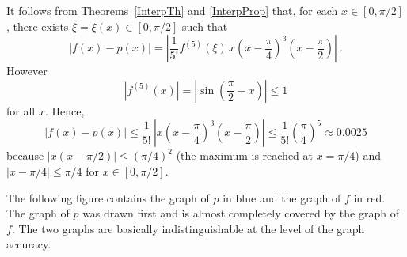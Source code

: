 {
It follows from Theorems~\ref{InterpTh} and \ref{InterpProp}
that, for each $x \in [0,\pi/2]$, there exists $\xi = \xi(x) \in [0,\pi/2]$
such that
\[
| f(x) - p(x) | = \left| \frac{1}{5!} f^{(5)}(\xi)
\, x \left(x-\frac{\pi}{4}\right)^3\left(x-\frac{\pi}{2}\right)\right| \ .
\]
However
\[
|f^{(5)}(x)| = \left| \sin\left( \frac{\pi}{2} - x\right)\right| \leq 1
\]
for all $x$.  Hence,
\[
| f(x) - p(x) | \leq \frac{1}{5!}\, \left|x \left(x-\frac{\pi}{4}\right)^3
\left(x-\frac{\pi}{2}\right) \right|
\leq \frac{1}{5!} \left(\frac{\pi}{4}\right)^5
\approx 0.0025
\]
because $\displaystyle \left|x (x-\pi/2) \right| \leq (\pi/4)^2$
(the maximum is reached at $x = \pi/4$) and
$\left|x-\pi/4\right|\leq \pi/4$ for $x \in [0,\pi/2]$.

 The following figure contains the graph of $p$ in blue and
the graph of $f$ in red.  The graph of $p$ was drawn first and is
almost completely covered by the graph of $f$.  The two graphs are
basically indistinguishable at the level of the graph accuracy.
}

